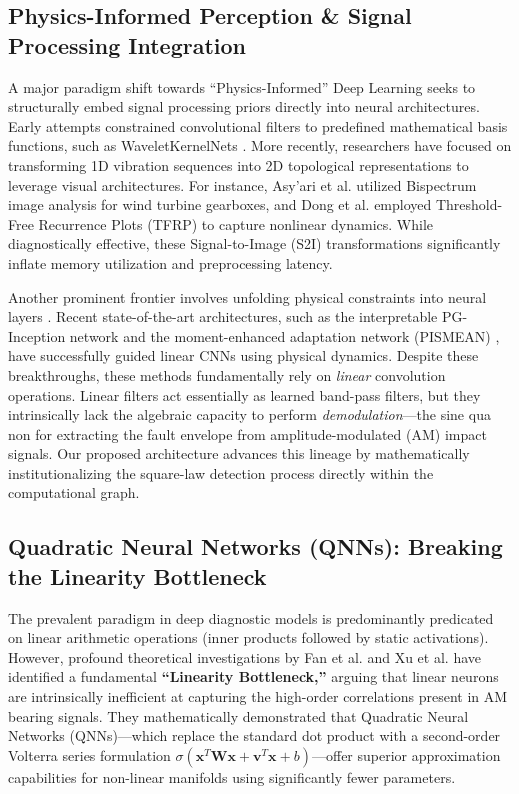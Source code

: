 \documentclass[5p,times,twocolumn]{elsarticle}
\begin{document}
\subsection{Physics-Informed Perception \& Signal Processing Integration}
A major paradigm shift towards ``Physics-Informed'' Deep Learning seeks to structurally embed signal processing priors directly into neural architectures. Early attempts constrained convolutional filters to predefined mathematical basis functions, such as WaveletKernelNets \cite{P11_Li, P31_He}. More recently, researchers have focused on transforming 1D vibration sequences into 2D topological representations to leverage visual architectures. For instance, Asy'ari et al. \cite{Asyari_NREL_2025} utilized Bispectrum image analysis for wind turbine gearboxes, and Dong et al. \cite{Ref_Dong_MSSP_2025} employed Threshold-Free Recurrence Plots (TFRP) to capture nonlinear dynamics. While diagnostically effective, these Signal-to-Image (S2I) transformations significantly inflate memory utilization and preprocessing latency.

Another prominent frontier involves unfolding physical constraints into neural layers \cite{P32_Liao, P33_Wang}. Recent state-of-the-art architectures, such as the interpretable PG-Inception network \cite{Ref_Wu_TIM_2026} and the moment-enhanced adaptation network (PISMEAN) \cite{Ref_Liu_AEI_2025}, have successfully guided linear CNNs using physical dynamics. Despite these breakthroughs, these methods fundamentally rely on \textit{linear} convolution operations. Linear filters act essentially as learned band-pass filters, but they intrinsically lack the algebraic capacity to perform \textit{demodulation}—the sine qua non for extracting the fault envelope from amplitude-modulated (AM) impact signals. Our proposed architecture advances this lineage by mathematically institutionalizing the square-law detection process directly within the computational graph.

\subsection{Quadratic Neural Networks (QNNs): Breaking the Linearity Bottleneck}
The prevalent paradigm in deep diagnostic models is predominantly predicated on linear arithmetic operations (inner products followed by static activations). However, profound theoretical investigations by Fan et al. \cite{P36_Fan} and Xu et al. \cite{P41_Xu} have identified a fundamental \textbf{``Linearity Bottleneck,''} arguing that linear neurons are intrinsically inefficient at capturing the high-order correlations present in AM bearing signals. They mathematically demonstrated that Quadratic Neural Networks (QNNs)—which replace the standard dot product with a second-order Volterra series formulation $\sigma(\mathbf{x}^T \mathbf{W} \mathbf{x} + \mathbf{v}^T \mathbf{x} + b)$—offer superior approximation capabilities for non-linear manifolds using significantly fewer parameters. 
\end{document}
